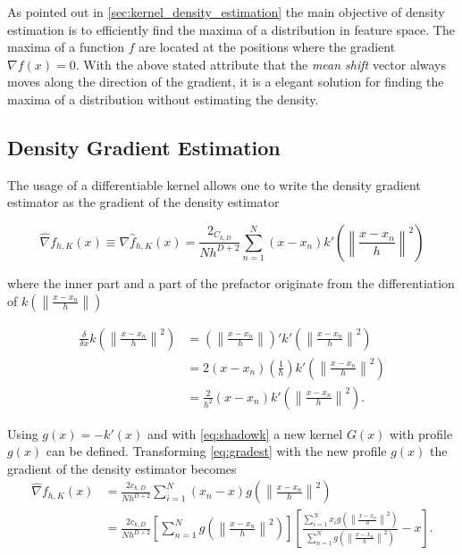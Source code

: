 As pointed out in \autoref{sec:kernel_density_estimation} the main objective of
density estimation is to efficiently find the maxima of a distribution in
feature space. The maxima of a function $f$ are located at the positions where
the gradient $\nabla f(x) = 0$. With the above stated attribute that the
\emph{mean shift} vector always moves along the direction of the gradient, it is
a elegant solution for finding the maxima of a distribution without estimating
the density.

\subsection{Density Gradient Estimation} %
\label{sub:gradient_estimation}
The usage of a differentiable kernel allows one to write the density gradient 
estimator as the gradient of the density estimator

\begin{equation}\label{eq:gradest}
	\hat{\nabla} f_{h,K}(x) \equiv \nabla \hat{f}_{h,K}(x) = 
	\frac{2_{C_{k,D}}}{Nh^{D+2}}%
	\sum_{n = 1}^N (x - x_n)k' 
	\left( \left\lVert \frac{x - x_n}{h} \right\rVert^2 \right)
\end{equation}

where the inner part and a part of the prefactor originate from the differentiation
of $k\left( \left\lVert \frac{x - x_n}{h} \right\rVert \right)$

\begin{equation}\label{eq:kerndiff}
	\begin{split}
		\frac{\delta}{\delta x}
		k\left( \left\lVert \frac{x - x_n}{h} \right\rVert^2 \right) & = 
		\left( \left\lVert \frac{x - x_n}{h} \right\rVert \right)'
		k'\left( \left\lVert \frac{x - x_n}{h} \right\rVert^2 \right) \\ & =
		2 \left( x - x_n \right) \left( \frac{1}{h} \right) 
		k'\left( \left\lVert \frac{x - x_n}{h} \right\rVert^2 \right) \\ & =
		\frac{2}{h^2}(x - x_n)
		k'\left( \left\lVert \frac{x - x_n}{h} \right\rVert^2 \right).
	\end{split}
\end{equation}

Using $g(x) = -k'(x)$ and with \autoref{eq:shadowk} a new kernel $G(x)$ with
profile $g(x)$ can be defined. Transforming \autoref{eq:gradest} with the new
profile $g(x)$ the gradient of the density estimator becomes
\begin{subequations}
	\begin{align}
	\hat{\nabla} f_{h,K}(x) & = \frac{2c_{k,D}}{Nh^{D+2}}\sum_{i=1}^N \left(x_n -
    x\right)g\left(\left\lVert \frac{x - x_n}{h} \right\rVert^2\right) \label{eq:gradest1}\\ & 
	= \frac{2c_{k,D}}{Nh^{D+2}} \left[ \sum_{n=1}^N g\left(\left\lVert
	\frac{x - x_n}{h} \right\rVert^2\right) \right] \left[
	\frac{\sum_{i=1}^N x_i g\left(\left\lVert \frac{x - x_n}{h}
	\right\rVert^2\right)}{\sum_{n=1}^N g\left(\left\lVert \frac{x - x_n}{h}
	\right\rVert^2\right)} - x \right].
	\label{eq:gradest2}
	\end{align}
\end{subequations}

